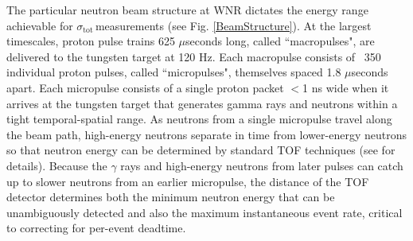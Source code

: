 \documentclass[twocolumn,secnumarabic,amssymb, nobibnotes, aps, prl,
superscriptaddress, nobalancelastpage]{revtex4}
\newcommand{\tots}{\ensuremath{\sigma_{\text{tot}}\,}}
\begin{document}
The particular neutron beam structure at WNR dictates the energy range
achievable for \tots measurements (see Fig. \ref{BeamStructure}).
At the largest timescales, proton pulse trains 625 $\mu$seconds long,
called ``macropulses", are delivered to the tungsten target at 120 Hz. Each 
macropulse
consists of ~350 individual proton pulses, called ``micropulses", themselves
spaced 1.8 $\mu$seconds apart. Each micropulse consists of a single proton 
packet $<$1 ns wide when 
it arrives at the
tungsten target that generates gamma rays and neutrons within a tight
temporal-spatial range. As neutrons from a single micropulse travel along the 
beam path, high-energy neutrons separate in time from lower-energy neutrons so 
that neutron energy can be determined by standard TOF techniques (see
\cite{TOFTechniques} for details). Because the $\gamma$ rays and high-energy
neutrons from later pulses can catch up to slower neutrons from an earlier
micropulse, the distance of the TOF detector determines both the minimum 
neutron energy that can be unambiguously detected
and also the maximum instantaneous event rate, critical to correcting for
per-event deadtime.
\end{document}
